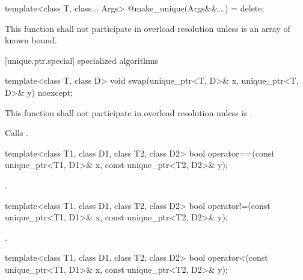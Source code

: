 %
\begin{itemdecl}
template<class T, class... Args> @\unspec@ make_unique(Args&&...) = delete;
\end{itemdecl}

\begin{itemdescr}
\pnum
\remarks This function shall not participate in overload resolution unless  is an array of known bound.

\end{itemdescr}

[unique.ptr.special]{ specialized algorithms}

%
\begin{itemdecl}
template<class T, class D> void swap(unique_ptr<T, D>& x, unique_ptr<T, D>& y) noexcept;
\end{itemdecl}

\begin{itemdescr}
\pnum
\remarks This function shall not participate in overload resolution
unless  is .

\pnum
\effects Calls .
\end{itemdescr}

%
\begin{itemdecl}
template<class T1, class D1, class T2, class D2>
  bool operator==(const unique_ptr<T1, D1>& x, const unique_ptr<T2, D2>& y);
\end{itemdecl}

\begin{itemdescr}
\pnum
\returns {}.
\end{itemdescr}

%
\begin{itemdecl}
template<class T1, class D1, class T2, class D2>
  bool operator!=(const unique_ptr<T1, D1>& x, const unique_ptr<T2, D2>& y);
\end{itemdecl}

\begin{itemdescr}
\pnum
\returns {}.
\end{itemdescr}

%
\begin{itemdecl}
template<class T1, class D1, class T2, class D2>
  bool operator<(const unique_ptr<T1, D1>& x, const unique_ptr<T2, D2>& y);
\end{itemdecl}

